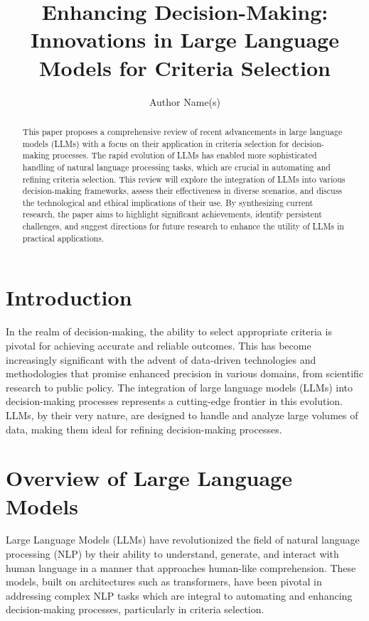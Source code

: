 \documentclass{article}
\title{Enhancing Decision-Making: Innovations in Large Language Models for Criteria Selection}
\author{Author Name(s)}
\date{}
\begin{document}
\maketitle

\begin{abstract}
This paper proposes a comprehensive review of recent advancements in large language models (LLMs) with a focus on their application in criteria selection for decision-making processes. The rapid evolution of LLMs has enabled more sophisticated handling of natural language processing tasks, which are crucial in automating and refining criteria selection. This review will explore the integration of LLMs into various decision-making frameworks, assess their effectiveness in diverse scenarios, and discuss the technological and ethical implications of their use. By synthesizing current research, the paper aims to highlight significant achievements, identify persistent challenges, and suggest directions for future research to enhance the utility of LLMs in practical applications.
\end{abstract}

\section{Introduction}
In the realm of decision-making, the ability to select appropriate criteria is pivotal for achieving accurate and reliable outcomes. This has become increasingly significant with the advent of data-driven technologies and methodologies that promise enhanced precision in various domains, from scientific research to public policy. The integration of large language models (LLMs) into decision-making processes represents a cutting-edge frontier in this evolution. LLMs, by their very nature, are designed to handle and analyze large volumes of data, making them ideal for refining decision-making processes.

\section{Overview of Large Language Models}
Large Language Models (LLMs) have revolutionized the field of natural language processing (NLP) by their ability to understand, generate, and interact with human language in a manner that approaches human-like comprehension. These models, built on architectures such as transformers, have been pivotal in addressing complex NLP tasks which are integral to automating and enhancing decision-making processes, particularly in criteria selection.
\end{document}
